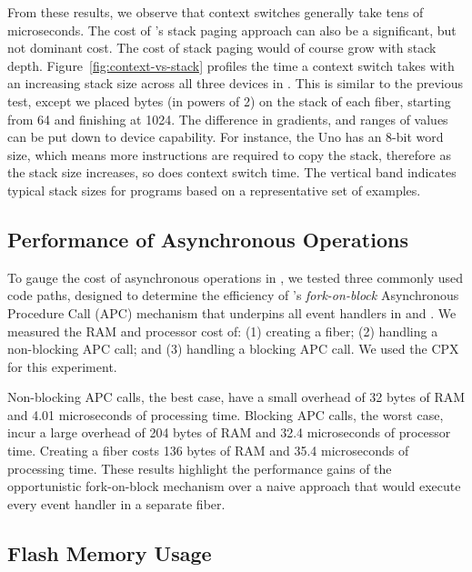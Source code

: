 From these results, we observe that context switches generally take tens of microseconds. The cost of \CON's stack paging approach can also be a significant, but not dominant cost. The cost of stack paging would of course grow with stack depth. Figure~\ref{fig:context-vs-stack} profiles the time a context switch takes with an increasing stack size across all three devices in \CON. This is similar to the previous test, except we placed bytes (in powers of 2) on the stack of each fiber, starting from 64 and finishing at 1024. The difference in gradients, and ranges of values can be put down to device capability. For instance, the Uno has an 8-bit word size, which means more instructions are required to copy the stack, therefore as the stack size increases, so does context switch time. The vertical band indicates typical stack sizes for \MC programs based on a representative set of examples.


\subsection{Performance of Asynchronous Operations}

To gauge the cost of asynchronous operations in \CON, we tested three commonly used code paths, designed to determine the efficiency of \CON's \emph{fork-on-block} Asynchronous Procedure Call (APC) mechanism that underpins all event handlers in \MC and \CON. We measured the RAM and processor cost of: (1) creating a fiber; (2) handling a non-blocking APC call; and (3) handling a blocking APC call. We used the CPX for this experiment.

Non-blocking APC calls, the best case, have a small overhead of 32 bytes of RAM and 4.01 microseconds of processing time. Blocking APC calls, the worst case, incur a large overhead of 204 bytes of RAM and 32.4 microseconds of processor time. Creating a fiber costs 136 bytes of RAM and 35.4 microseconds of processing time. These results highlight the performance gains of the opportunistic fork-on-block mechanism over a naive approach that would execute every event handler in a separate fiber.

\subsection{Flash Memory Usage}

